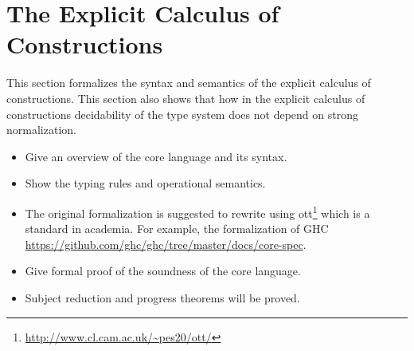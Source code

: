\section{The Explicit Calculus of Constructions}

This section formalizes the syntax and semantics of the explicit calculus 
of constructions. This section also shows that how in the explicit 
calculus of constructions decidability of the type system does not 
depend on strong normalization.

\begin{itemize}
\item Give an overview of the core language and its syntax.
\item Show the typing rules and operational semantics.
\item The original formalization is suggested to rewrite using \textsf{ott}\footnote{\url{http://www.cl.cam.ac.uk/~pes20/ott/}} which is a standard in academia. For example, the formalization of GHC \url{https://github.com/ghc/ghc/tree/master/docs/core-spec}.
\item Give formal proof of the soundness of the core language.
\item Subject reduction and progress theorems will be proved.
\end{itemize}